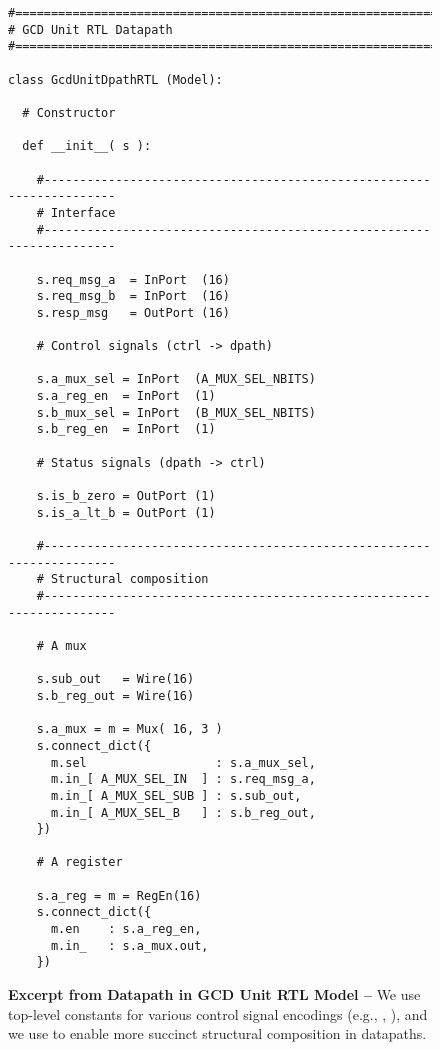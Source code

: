 
\begin{figure}

  \begin{lstlisting}[xleftmargin={0.9in}]
#=========================================================================
# GCD Unit RTL Datapath
#=========================================================================

class GcdUnitDpathRTL (Model):

  # Constructor

  def __init__( s ):

    #---------------------------------------------------------------------
    # Interface
    #---------------------------------------------------------------------

    s.req_msg_a  = InPort  (16)
    s.req_msg_b  = InPort  (16)
    s.resp_msg   = OutPort (16)

    # Control signals (ctrl -> dpath)

    s.a_mux_sel = InPort  (A_MUX_SEL_NBITS)
    s.a_reg_en  = InPort  (1)
    s.b_mux_sel = InPort  (B_MUX_SEL_NBITS)
    s.b_reg_en  = InPort  (1)

    # Status signals (dpath -> ctrl)

    s.is_b_zero = OutPort (1)
    s.is_a_lt_b = OutPort (1)

    #---------------------------------------------------------------------
    # Structural composition
    #---------------------------------------------------------------------

    # A mux

    s.sub_out   = Wire(16)
    s.b_reg_out = Wire(16)

    s.a_mux = m = Mux( 16, 3 )
    s.connect_dict({
      m.sel                  : s.a_mux_sel,
      m.in_[ A_MUX_SEL_IN  ] : s.req_msg_a,
      m.in_[ A_MUX_SEL_SUB ] : s.sub_out,
      m.in_[ A_MUX_SEL_B   ] : s.b_reg_out,
    })

    # A register

    s.a_reg = m = RegEn(16)
    s.connect_dict({
      m.en    : s.a_reg_en,
      m.in_   : s.a_mux.out,
    })
\end{lstlisting}

  \caption{\textbf{Excerpt from Datapath in GCD Unit RTL Model --} We use
    top-level constants for various control signal encodings (e.g.,
    , ), and we use
     to enable more succinct structural composition in
    datapaths.}
  \label{code-tut3-gcd-dpath}

\end{figure}

